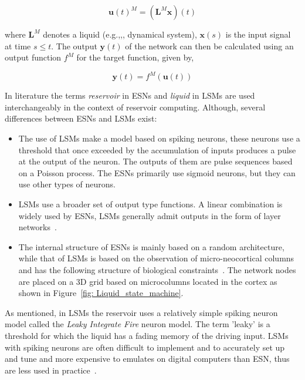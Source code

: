 \documentclass{WitsPhysicsReport}
\begin{document}

\begin{equation}
\mathbf{u}(t)^{M} = (\mathbf{L}^{M} \mathbf{x})(t) 
\label{equ:liquid_states}
\end{equation}



where $\mathbf{L}^{M}$ denotes a liquid (e.g.,,, dynamical system), $\mathbf{x}(s)$ is the input signal at time $s \leq t$. The output $ \mathbf{y}(t)$ of the network can then be calculated using an output function $f^{M}$ for the target function, given by,

\begin{equation}
\mathbf{y}(t) = f^{M} (\mathbf{u}(t) )
\label{equ:liquid_readouts}
\end{equation}


In literature the terms \textit{reservoir} in ESNs and \textit{liquid} in LSMs are used interchangeably in the context of reservoir computing. Although, several differences between ESNs and LSMs exist:

\begin{itemize}
\item The use of LSMs make a model based on spiking neurons, these neurons use a threshold that once exceeded by the
accumulation of inputs produces a pulse at the output of the neuron. The outputs of them are pulse sequences based on a Poisson process. The ESNs primarily use sigmoid neurons, but they can use other types of neurons.

\item LSMs use a broader set of output type functions. A linear combination is widely used by ESNs, LSMs generally admit outputs in the form of layer networks~\cite{Schaetti2015}.

\item   The internal structure of ESNs is mainly based on a random architecture, while that of LSMs is based on the observation of micro-neocortical columns and has the following structure of biological constraints~\cite{Schaetti2015}. The network nodes are placed on a 3D grid based on microcolumns located in the cortex as shown in Figure~\ref{fig: Liquid_state_machine}.
\label{item:differences}
\end{itemize}


As mentioned, in LSMs the reservoir uses a relatively simple spiking neuron model called the \textit{Leaky Integrate Fire} neuron model. The term 'leaky' is a threshold for which the liquid has a fading memory of the driving input. LSMs with spiking neurons are often difficult to implement and to accurately set up and tune and more expensive to emulates on digital computers than ESN, thus are less used in practice~\cite{lukovsevivcius2009reservoir}.
\end{document}
